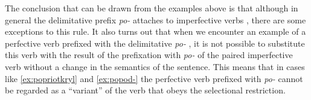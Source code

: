 The conclusion that can be drawn from the examples above is that although in general the delimitative  prefix \textit{po-}   attaches to imperfective verbs , there are some exceptions to this rule. It also turns out that when we encounter an example of a perfective verb  prefixed with the delimitative  \textit{po-} , it is not possible to substitute this verb with the result of the prefixation  with \textit{po-}   of the paired imperfective verb  without a change in the semantics of the sentence. This means that in cases like \ref{ex:popriotkryl} and \ref{ex:popod-} the perfective verb  prefixed with \textit{po-}   cannot be regarded as a ``variant'' of the verb that obeys the selectional restriction.
 
